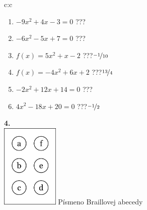 \documentclass[10pt]{report}
\begin{document}
\begin{tabular}{c:c}
\begin{minipage}[c][104.5mm][t]{0.5\linewidth}
\begin{center}
\begin{minipage}{0.79\linewidth}
\begin{center}
\begin{varwidth}{\linewidth}
\begin{enumerate}
\Large
\item $-9x^2+4x-3=0$\quad \dotfill\; ???\;\dotfill {}
\item $-6x^2-5x+7=0$\quad \dotfill\; ???\;\dotfill {}
\item $f(x)=5x^2+x-2$\quad \dotfill\; ???\;\dotfill \quad $\nicefrac{-1}{10}$
\item $f(x)=-4x^2+6x+2$\quad \dotfill\; ???\;\dotfill \quad $\nicefrac{13}{4}$
\item $-2x^2+12x+14=0$\quad \dotfill\; ???\;\dotfill {}
\item $4x^2-18x+20=0$\quad \dotfill\; ???\;\dotfill \quad $\nicefrac{-1}{2}$
\end{enumerate}
\end{varwidth}
\end{center}
\end{minipage}
\begin{minipage}{0.20\linewidth}
\begin{center}
{\Huge\bfseries 4.} \\[2mm]
\includegraphics[height=40mm]{../images/braille.png}
{\small Písmeno Braillovej abecedy}
\end{center}
\end{minipage}
\end{center}
\end{minipage}
%
\end{tabular}
\newpage
\thispagestyle{empty}
\end{document}
